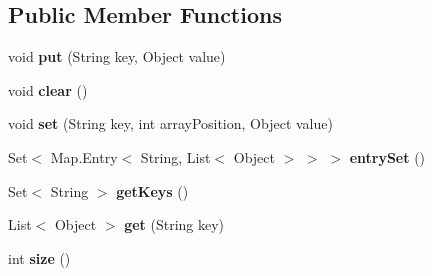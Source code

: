 \subsection*{Public Member Functions}
\begin{DoxyCompactItemize}
\item 
void {\bfseries put} (String key, Object value)\hypertarget{classcom_1_1example_1_1sebastian_1_1tindertp_1_1commonTools_1_1MultiHashMap_af2b487cf1d0b0da3a2babf9f55226796}{}\label{classcom_1_1example_1_1sebastian_1_1tindertp_1_1commonTools_1_1MultiHashMap_af2b487cf1d0b0da3a2babf9f55226796}

\item 
void {\bfseries clear} ()\hypertarget{classcom_1_1example_1_1sebastian_1_1tindertp_1_1commonTools_1_1MultiHashMap_a2ceed48a0d2340fecb2c72ed11f34d03}{}\label{classcom_1_1example_1_1sebastian_1_1tindertp_1_1commonTools_1_1MultiHashMap_a2ceed48a0d2340fecb2c72ed11f34d03}

\item 
void {\bfseries set} (String key, int array\+Position, Object value)\hypertarget{classcom_1_1example_1_1sebastian_1_1tindertp_1_1commonTools_1_1MultiHashMap_a25294edd77efddca1e55719b1a94e1d6}{}\label{classcom_1_1example_1_1sebastian_1_1tindertp_1_1commonTools_1_1MultiHashMap_a25294edd77efddca1e55719b1a94e1d6}

\item 
Set$<$ Map.\+Entry$<$ String, List$<$ Object $>$ $>$ $>$ {\bfseries entry\+Set} ()\hypertarget{classcom_1_1example_1_1sebastian_1_1tindertp_1_1commonTools_1_1MultiHashMap_a2567ab4c55f7f38e85d16dd28a5f1d5f}{}\label{classcom_1_1example_1_1sebastian_1_1tindertp_1_1commonTools_1_1MultiHashMap_a2567ab4c55f7f38e85d16dd28a5f1d5f}

\item 
Set$<$ String $>$ {\bfseries get\+Keys} ()\hypertarget{classcom_1_1example_1_1sebastian_1_1tindertp_1_1commonTools_1_1MultiHashMap_a4923272ac3bd3174efdb907d800f21d5}{}\label{classcom_1_1example_1_1sebastian_1_1tindertp_1_1commonTools_1_1MultiHashMap_a4923272ac3bd3174efdb907d800f21d5}

\item 
List$<$ Object $>$ {\bfseries get} (String key)\hypertarget{classcom_1_1example_1_1sebastian_1_1tindertp_1_1commonTools_1_1MultiHashMap_ab9ad00f65cd6478ffd29913a79a12370}{}\label{classcom_1_1example_1_1sebastian_1_1tindertp_1_1commonTools_1_1MultiHashMap_ab9ad00f65cd6478ffd29913a79a12370}

\item 
int {\bfseries size} ()\hypertarget{classcom_1_1example_1_1sebastian_1_1tindertp_1_1commonTools_1_1MultiHashMap_aa04a854d8a31507a77b973c3568b6503}{}\label{classcom_1_1example_1_1sebastian_1_1tindertp_1_1commonTools_1_1MultiHashMap_aa04a854d8a31507a77b973c3568b6503}


\end{DoxyCompactItemize}
